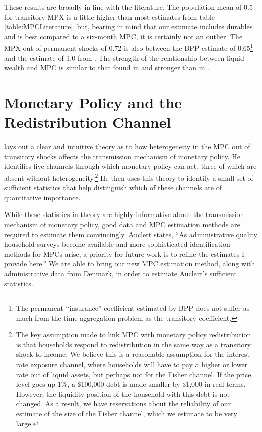 \documentclass[titlepage]{\econtex}\newcommand{\texname}{ConsumptionHeterogeneity}
\begin{document}
These results are broadly in line with the literature. The population mean of 0.5 for transitory MPX is a little higher than most estimates from table \ref{table:MPCLiterature}, but, bearing in mind that our estimate includes durables and is best compared to a six-month MPC, it is certainly not an outlier. The MPX out of permanent shocks of 0.72 is also between the BPP estimate of 0.65\footnote{The permanent ``insurance'' coefficient estimated by BPP does not suffer as much from the time aggregation problem as the transitory coefficient.} and the estimate of 1.0 from \cite{gelman_response_2016}. The strength of the relationship between liquid wealth and MPC is similar to that found in \cite{gelman_what_2016} and stronger than in \cite{fagereng_mpc_2016}.

\section{Monetary Policy and the Redistribution Channel} \label{monetary_policy}
\cite{auclert_monetary_2017} lays out a clear and intuitive theory as to how heterogeneity in the MPC out of transitory shocks affects the transmission mechanism of monetary policy. He identifies five channels through which monetary policy can act, three of which are absent without heterogeneity.\footnote{The key assumption made to link MPC with monetary policy redistribution is that households respond to redistribution in the same way as a transitory shock to income. We believe this is a reasonable assumption for the interest rate exposure channel, where households will have to pay a higher or lower rate out of liquid assets, but perhaps not for the Fisher channel. If the price level goes up 1\%, a \$100,000 debt is made smaller by \$1,000 in real terms. However, the liquidity position of the household with this debt is not changed. As a result, we have reservations about the reliability of our estimate of the size of the Fisher channel, which we estimate to be very large.} He then uses this theory to identify a small set of sufficient statistics that help distinguish which of these channels are of quantitative importance.

While these statistics in theory are highly informative about the transmission mechanism of monetary policy, good data and MPC estimation methods are required to estimate them convincingly. Auclert states, ``As administrative quality household surveys become available and more sophisticated identification methods for MPCs arise, a priority for future work is to refine the estimates I provide here.'' We are able to bring our new MPC estimation method, along with administrative data from Denmark, in order to estimate Auclert's sufficient statistics.
\end{document}
